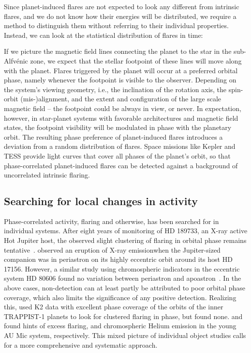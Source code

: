 \documentclass[twocolumn]{aastex631}
\begin{document}
Since planet-induced flares are not expected to look any different from intrinsic flares, and we do not know how their energies will be distributed, we require a method to distinguish them without referring to their individual properties. Instead, we can look at the statistical distribution of flares in time: 

If we picture the magnetic field lines connecting the planet to the star in the sub-Alfv\'enic zone, we expect that the stellar footpoint of these lines will move along with the planet. Flares triggered by the planet will occur at a preferred orbital phase, namely whenever the footpoint is visible to the observer. Depending on the system's viewing geometry, i.e., the inclination of the rotation axis, the spin-orbit (mis-)alignment, and the extent and configuration of the large scale magnetic field -- the footpoint could be always in view, or never. In expectation, however, in star-planet systems with favorable architectures and magnetic field states, the footpoint visibility will be modulated in phase with the planetary orbit. The resulting phase preference of planet-induced flares introduces a deviation from a random distribution of flares. Space missions like Kepler and TESS provide light curves that cover all phases of the planet's orbit, so that phase-correlated planet-induced flares can be detected against a background of uncorrelated intrinsic flaring. 

\subsection{Searching for local changes in activity}
\label{sec:intro:local}
Phase-correlated activity, flaring and otherwise, has been searched for in individual systems. After eight years of monitoring of HD 189733, an X-ray active Hot Jupiter host, the observed slight clustering of flaring in orbital phase remains tentative~\citep{pillitteri2022xray}. \citet{maggio2015coordinated} observed an eruption of X-ray emissionwhen the Jupiter-sized companion was in periastron on its highly eccentric orbit around its host HD 17156. However, a similar study using chromospheric indicators in the eccentric system HD 80606 found no variation between periastron and apoastron~\citep{figueira2016activity}. In the above cases, non-detection can at least partly be attributed to poor orbital phase coverage, which also limits the significance of any positive detection. Realizing this, \citet{fischer2019timevariable} used K2 data with excellent phase coverage of the orbits of the inner TRAPPIST-1 planets to look for clustered flaring in phase, but found none. \citet{ilin2022searching} and \citet{klein2022one} found hints of excess flaring, and chromospheric Helium emission in the young AU Mic system, respectively. This mixed picture of individual object studies calls for a more comprehensive and systematic approach.
\end{document}
